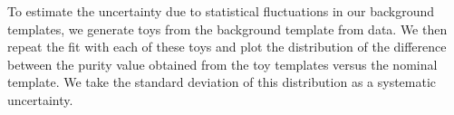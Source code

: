 To estimate the uncertainty due to statistical fluctuations in our background templates, we generate toys from the background template from data. 
We then repeat the fit with each of these toys and plot the distribution of the difference between the purity value obtained from the toy templates versus the nominal template. 
We take the standard deviation of this distribution as a systematic uncertainty. %

